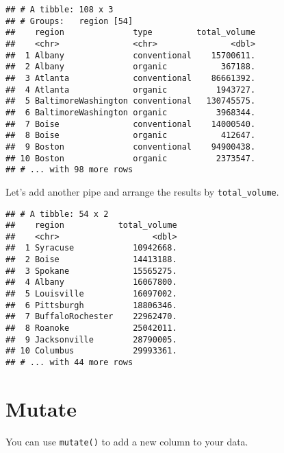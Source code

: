 \documentclass[]{book}
\newenvironment{Shaded}{\begin{snugshade}}{\end{snugshade}}
\newcommand{\DataTypeTok}[1]{\textcolor[rgb]{0.13,0.29,0.53}{#1}}
\newcommand{\KeywordTok}[1]{\textcolor[rgb]{0.13,0.29,0.53}{\textbf{#1}}}
\newcommand{\NormalTok}[1]{#1}
\newcommand{\OperatorTok}[1]{\textcolor[rgb]{0.81,0.36,0.00}{\textbf{#1}}}
\newcommand{\StringTok}[1]{\textcolor[rgb]{0.31,0.60,0.02}{#1}}
\begin{document}
\begin{verbatim}
## # A tibble: 108 x 3
## # Groups:   region [54]
##    region              type         total_volume
##    <chr>               <chr>               <dbl>
##  1 Albany              conventional    15700611.
##  2 Albany              organic           367188.
##  3 Atlanta             conventional    86661392.
##  4 Atlanta             organic          1943727.
##  5 BaltimoreWashington conventional   130745575.
##  6 BaltimoreWashington organic          3968344.
##  7 Boise               conventional    14000540.
##  8 Boise               organic           412647.
##  9 Boston              conventional    94900438.
## 10 Boston              organic          2373547.
## # ... with 98 more rows
\end{verbatim}

Let's add another pipe and arrange the results by \texttt{total\_volume}.

\begin{Shaded}
\end{Shaded}

\begin{verbatim}
## # A tibble: 54 x 2
##    region           total_volume
##    <chr>                   <dbl>
##  1 Syracuse            10942668.
##  2 Boise               14413188.
##  3 Spokane             15565275.
##  4 Albany              16067800.
##  5 Louisville          16097002.
##  6 Pittsburgh          18806346.
##  7 BuffaloRochester    22962470.
##  8 Roanoke             25042011.
##  9 Jacksonville        28790005.
## 10 Columbus            29993361.
## # ... with 44 more rows
\end{verbatim}

\hypertarget{mutate}{%
\section{Mutate}\label{mutate}}

You can use \texttt{mutate()} to add a new column to your data.
\end{document}
